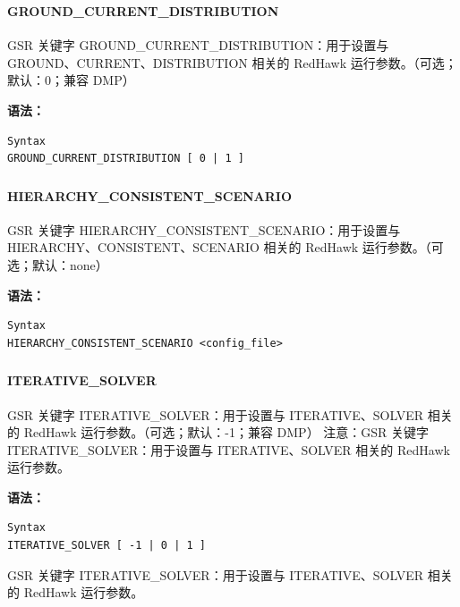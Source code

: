 \subsubsection{}
\paragraph*{GROUND_CURRENT_DISTRIBUTION}

GSR 关键字 GROUND_CURRENT_DISTRIBUTION：用于设置与 GROUND、CURRENT、DISTRIBUTION 相关的 RedHawk 运行参数。（可选；默认：0；兼容 DMP）

\textbf{语法：}
\begin{lstlisting}
Syntax
GROUND_CURRENT_DISTRIBUTION [ 0 | 1 ]
\end{lstlisting}

\subsubsection{}
\paragraph*{HIERARCHY_CONSISTENT_SCENARIO}

GSR 关键字 HIERARCHY_CONSISTENT_SCENARIO：用于设置与 HIERARCHY、CONSISTENT、SCENARIO 相关的 RedHawk 运行参数。（可选；默认：none）

\textbf{语法：}
\begin{lstlisting}
Syntax
HIERARCHY_CONSISTENT_SCENARIO <config_file>
\end{lstlisting}

\subsubsection{}
\paragraph*{ITERATIVE_SOLVER}

GSR 关键字 ITERATIVE_SOLVER：用于设置与 ITERATIVE、SOLVER 相关的 RedHawk 运行参数。（可选；默认：-1；兼容 DMP） 注意：GSR 关键字 ITERATIVE_SOLVER：用于设置与 ITERATIVE、SOLVER 相关的 RedHawk 运行参数。

\textbf{语法：}
\begin{lstlisting}
Syntax
ITERATIVE_SOLVER [ -1 | 0 | 1 ]
\end{lstlisting}

\begin{noteBox}
GSR 关键字 ITERATIVE\_SOLVER：用于设置与 ITERATIVE、SOLVER 相关的 RedHawk 运行参数。
\end{noteBox}

